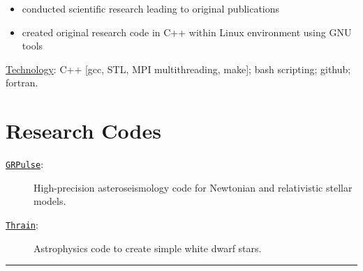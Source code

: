 \documentclass[11pt, letter]{article}
\begin{document}
\begin{minipage}{\textwidth}
\begin{description}
\begin{itemize}
			\item conducted scientific research leading to original publications
			\item created original research code in C++ within Linux environment using GNU tools
		\end{itemize}
		\vspace{-0.5\baselineskip}
		\underline{Technology}: 
		C++ [gcc, STL, MPI multithreading, make]; bash scripting; github; fortran.
		\vspace{-0.5\baselineskip}
	\end{description}
\end{minipage}

\section*{Research Codes}
\begin{minipage}{\textwidth}
	\begin{description}
		\item[\href{https://github.com/rboston628/grpulse}{\tt GRPulse}:] High-precision asteroseismology code for Newtonian and relativistic stellar models.			
		\item[\href{https://github.com/rboston628/thrain}{\tt Thrain}:] Astrophysics code to create simple white dwarf stars.
	\end{description}
\hrule
\end{minipage}

\vspace{-0.5\baselineskip}
\end{document}
